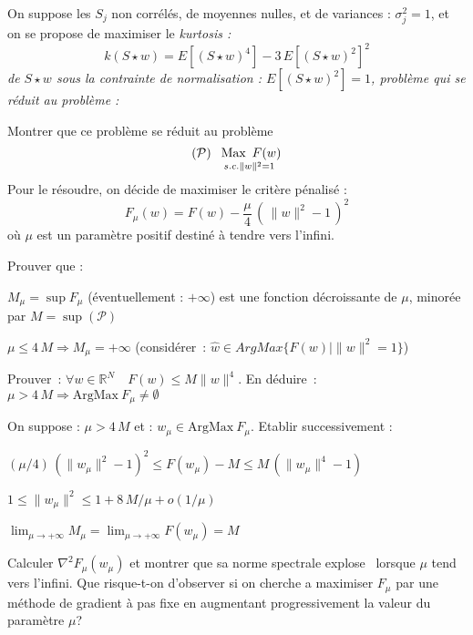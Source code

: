 \documentclass[12pt,a4paper,fleqn]{report}
\newcommand{\R}{\mathbb R}
\newcommand{\hess}{\nabla^2}
\newcommand{\on}{\begin{displaymath}}
\newcommand{\off}{\end{displaymath}}
\renewcommand{\P}{\mathcal P}
\newcommand{\push}[1]{\rule{0pt}{0pt}\hspace{#1pt}}
\begin{document}
\begin{exercice}
On suppose les $S_j$ non corrélés, de moyennes nulles, et de variances :  $\sigma_j^2=1$, et on se propose de maximiser le \it kurtosis \rm :  
\on  k(S\star w)= E[(S\star w)^4] -3\,E[(S\star w)^2] ^2 \off
de $S\star w$  sous la contrainte de normalisation : \mbox{$E[(S\star w)^2]=1$}, problème qui se réduit  au problème :

  \begin{questions}
  \item Montrer que ce problème se réduit au problème
    \on ( \P)  \push{5} \underset{ s. c. \|w\|^2=1}{\push
      3\mbox{Max}\push 5 F(w)}  \off
     Pour le résoudre, on décide de maximiser le critère  pénalisé :  
 \on F_{\mu}(w)=F(w)-\frac{\mu}{4}\,\left(\,\|w\|^2-1\,\right)^2 \off
 où $\mu$ est un paramètre positif destiné à tendre vers l'infini. 
\item Prouver que : 
\begin{subquestions}
\item$M_{\mu}= \sup F_{\mu}$ (éventuellement : $+\infty$) est une fonction décroissante de $\mu$, minorée par $M=\sup (\P)$
\item $\mu\leq 4\,M \Rightarrow M_{\mu}=+\infty$ (considérer~: $\hat w\in ArgMax \{F(w)   |   \|w\|^2=1   \}$)
\item Prouver~: $\forall w\in\R^N \quad F(w)\leq M \|w\|^4$. En déduire~: $\mu> 4\,M \Rightarrow \mathrm{ArgMax}\ F_{\mu} \neq \emptyset$ 
\end{subquestions}
\item On suppose : $\mu> 4\,M$ et : $w_{\mu}\in\mathrm{ArgMax}\ F_{\mu}$. Etablir successivement :
\begin{subquestions}
\item $ (\mu/4)\,(\|w_{\mu}\|^2-1)^2 \leq F(w_{\mu})-M\leq M\,(\|w_{\mu}\|^4-1)$
\item $1\leq \|w_{\mu}\|^2\leq 1+8\,M/\mu +o(1/\mu)$
\item $\lim_{\mu\rightarrow +\infty} M_{\mu}=\lim_{\mu\rightarrow +\infty} F(w_{\mu})= M$
\end{subquestions}
\item Calculer $\hess F_{\mu}(w_{\mu})$ et montrer que sa norme spectrale  \og explose \fg\  lorsque $\mu$ tend vers l'infini.
Que risque-t-on d'observer si on cherche a maximiser $F_{\mu}$ par une méthode de gradient à pas fixe en augmentant progressivement la valeur du paramètre $\mu$?
\end{questions}
\end{exercice}
\end{document}
